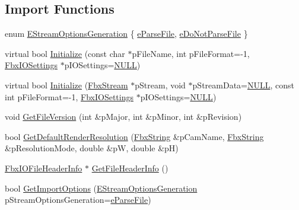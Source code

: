 \subsection*{Import Functions}
\begin{DoxyCompactItemize}
\item 
enum \hyperlink{class_fbx_importer_a5174c9311e7e1295e7bf3338d209def5}{E\+Stream\+Options\+Generation} \{ \hyperlink{class_fbx_importer_a5174c9311e7e1295e7bf3338d209def5a1f5881070de76430876af4547ce9fc0a}{e\+Parse\+File}, 
\hyperlink{class_fbx_importer_a5174c9311e7e1295e7bf3338d209def5a42759353b2b5126a87bae098ad2724ae}{e\+Do\+Not\+Parse\+File}
 \}
\item 
virtual bool \hyperlink{class_fbx_importer_a70528a9ca1ff737bda9696a2073acd13}{Initialize} (const char $\ast$p\+File\+Name, int p\+File\+Format=-\/1, \hyperlink{class_fbx_i_o_settings}{Fbx\+I\+O\+Settings} $\ast$p\+I\+O\+Settings=\hyperlink{fbxarch_8h_a070d2ce7b6bb7e5c05602aa8c308d0c4}{N\+U\+LL})
\item 
virtual bool \hyperlink{class_fbx_importer_a2d0a79950f85425d82e135e58aadd8fc}{Initialize} (\hyperlink{class_fbx_stream}{Fbx\+Stream} $\ast$p\+Stream, void $\ast$p\+Stream\+Data=\hyperlink{fbxarch_8h_a070d2ce7b6bb7e5c05602aa8c308d0c4}{N\+U\+LL}, const int p\+File\+Format=-\/1, \hyperlink{class_fbx_i_o_settings}{Fbx\+I\+O\+Settings} $\ast$p\+I\+O\+Settings=\hyperlink{fbxarch_8h_a070d2ce7b6bb7e5c05602aa8c308d0c4}{N\+U\+LL})
\item 
void \hyperlink{class_fbx_importer_a4f7e10acb75be641cce256bc1f9fd13f}{Get\+File\+Version} (int \&p\+Major, int \&p\+Minor, int \&p\+Revision)
\item 
bool \hyperlink{class_fbx_importer_a6c3c333c150d14f9bade0a3f7465ba00}{Get\+Default\+Render\+Resolution} (\hyperlink{class_fbx_string}{Fbx\+String} \&p\+Cam\+Name, \hyperlink{class_fbx_string}{Fbx\+String} \&p\+Resolution\+Mode, double \&pW, double \&pH)
\item 
\hyperlink{class_fbx_i_o_file_header_info}{Fbx\+I\+O\+File\+Header\+Info} $\ast$ \hyperlink{class_fbx_importer_aceaf0258f8ad1275cbe6bf245133e058}{Get\+File\+Header\+Info} ()
\item 
bool \hyperlink{class_fbx_importer_a0629fb996e8dfbc147f2ce9dd084eba0}{Get\+Import\+Options} (\hyperlink{class_fbx_importer_a5174c9311e7e1295e7bf3338d209def5}{E\+Stream\+Options\+Generation} p\+Stream\+Options\+Generation=\hyperlink{class_fbx_importer_a5174c9311e7e1295e7bf3338d209def5a1f5881070de76430876af4547ce9fc0a}{e\+Parse\+File})
\item 

\end{DoxyCompactItemize}
